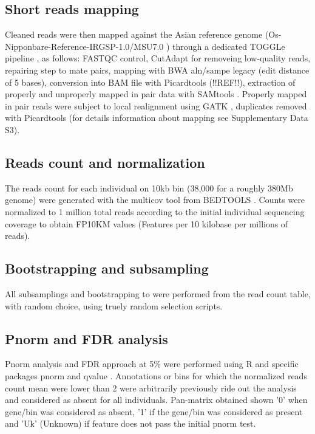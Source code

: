 \documentclass[10pt,letterpaper]{article}
\begin{document}
\subsection*{Short reads mapping}
Cleaned reads were then mapped against the Asian reference genome (Os-Nipponbare-Reference-IRGSP-1.0/MSU7.0 \cite{Mcnally2009, Kawahara2013}) through a dedicated TOGGLe pipeline \cite{Monat2015, Tranchant2018}, as follows:
FASTQC control, CutAdapt for removeing low-quality reads, repairing step to mate pairs, mapping with BWA aln/sampe legacy \cite{Li2009} (edit distance of 5 bases), conversion into BAM file with Picardtools (!!REF!!), extraction of properly and unproperly mapped in pair data with SAMtools \cite{Li2009a}. Properly mapped in pair reads were subject to  local realignment using GATK \cite{McKenna2010a}, duplicates removed with Picardtools (for details information about mapping see Supplementary Data S3).


\subsection*{Reads count and normalization}
The reads count for each individual on 10kb bin (38,000 for a roughly 380Mb genome) were generated with the multicov tool from BEDTOOLS \cite{Quinlan2014}. Counts were normalized to 1 million total reads according to the initial individual sequencing coverage to obtain FP10KM values (Features per 10 kilobase per millions of reads).

\subsection*{Bootstrapping and subsampling}
All subsamplings and bootstrapping to were performed from the read count table, with random choice, using truely random selection scripts. 

\subsection*{Pnorm and FDR analysis}
Pnorm analysis and FDR approach at 5\% were performed using R and specific packages pnorm and qvalue \cite{Storey2015}. Annotations or bins for which the normalized reads count mean were lower than 2 were arbitrarily previously ride out the analysis and considered as absent for all individuals. Pan-matrix obtained shown '0' when gene/bin was considered as absent,  '1' if the gene/bin was considered as present and  'Uk' (Unknown) if feature does not pass the initial pnorm test.
\end{document}
